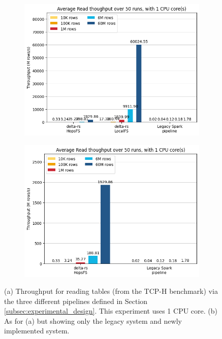 \begin{figure}
    \centering
    \begin{subfigure}[b]{\textwidth}
        \includegraphics[width=\textwidth]{figures/5-results/diagram_three_tech_read_1_core.png}
       \caption{}
       \label{fig:res_reading_3}
    \end{subfigure}
    
    \begin{subfigure}[b]{\textwidth}
        \includegraphics[width=\textwidth]{figures/5-results/diagram_two_tech_read_1_core.png}
       \caption{}
       \label{fig:res_reading_2}
    \end{subfigure}
    
    \caption{(a) Throughput for reading tables (from the TCP-H benchmark) via the three different pipelines defined in Section \ref{subsec:experimental_design}. This experiment uses 1 \gls{CPU} core.
    (b) As for (a) but showing only the legacy system and newly implemented system.}
\end{figure}

